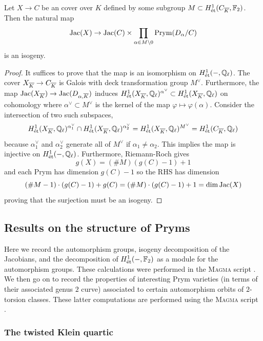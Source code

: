 \documentclass[main.tex]{subfiles}
\begin{document}
\begin{lemma} \label{lemma:prym_decomposition}
Let $X \to C$ be an \etale cover over $K$ defined by some subgroup $M \subset H^1_{\mathrm{\acute{e}t}}(C_{\overline{K}}, \mathbb{F}_{2})$. Then the natural map
\[ \operatorname{\mathrm{Jac}}(X) \to \operatorname{\mathrm{Jac}}(C) \times \prod_{\alpha \in M \setminus 0} \operatorname{\mathrm{Prym}}(D_{\alpha}/C) \]
is an isogeny. 
\end{lemma}

\begin{proof}
It suffices to prove that the map is an isomorphism on $H^1_{\mathrm{\acute{e}t}}(-, \mathbb{Q}_{\ell})$. The cover $X_{\overline{K}} \to C_{\overline{K}}$ is Galois with deck transformation group $M^{\vee}$. Furthermore, the map $\operatorname{\mathrm{Jac}}(X_{\overline{K}}) \to \operatorname{\mathrm{Jac}}(D_{\alpha, \overline{K}})$ induces $H^1_{\mathrm{\acute{e}t}}(X_{\overline{K}}, \mathbb{Q}_{\ell})^{\alpha^{\vee}} \subset H^1_{\mathrm{\acute{e}t}}(X_{\overline{K}}, \mathbb{Q}_{\ell})$ on cohomology where $\alpha^{\vee} \subset M^{\vee}$ is the kernel of the map $\varphi \mapsto \varphi(\alpha)$. Consider the intersection of two such subspaces,
\[ H^1_{\mathrm{\acute{e}t}}(X_{\overline{K}}, \mathbb{Q}_{\ell})^{\alpha_1^{\vee}} \cap H^1_{\mathrm{\acute{e}t}}(X_{\overline{K}}, \mathbb{Q}_{\ell})^{\alpha_2^{\vee}} = H^1_{\mathrm{\acute{e}t}}(X_{\overline{K}}, \mathbb{Q}_{\ell})^{M^{\vee}} = H^1_{\mathrm{\acute{e}t}}(C_{\overline{K}}, \mathbb{Q}_{\ell}) \]
because $\alpha_1^{\vee}$ and $\alpha_2^{\vee}$ generate all of $M^{\vee}$ if $\alpha_1 \neq \alpha_2$. This implies the map is injective on $H^1_{\mathrm{\acute{e}t}}(-, \mathbb{Q}_{\ell})$. Furthermore, Riemann-Roch gives
\[ g(X) = (\# M) (g(C) - 1) + 1 \]
and each Prym has dimension $g(C) - 1$ so the RHS has dimension
\[ (\# M - 1) \cdot (g(C) - 1) + g(C) = (\# M) \cdot (g(C) - 1) + 1  = \dim{\operatorname{\mathrm{Jac}}(X)} \]
proving that the surjection must be an isogeny.
\end{proof}

\subsection{Results on the structure of Pryms}

Here we record the automorphism groups, isogeny decomposition of the Jacobians, and the decomposition of $H^1_{\mathrm{\acute{e}t}}(-, \mathbb{F}_2)$ as a module for the automorphism groups. These calculations were performed in the \textsc{Magma} script \cite[\texttt{aut\_j2\_modules.m}]{church:github}. We then go on to record the properties of interesting Prym varieties (in terms of their associated genus $2$ curve) associated to certain automorphism orbits of $2$-torsion classes. These latter computations are performed using the \textsc{Magma} script \cite[\texttt{steiner\_computations.m}]{church:github}. 

\subsubsection{The twisted Klein quartic}
\end{document}
